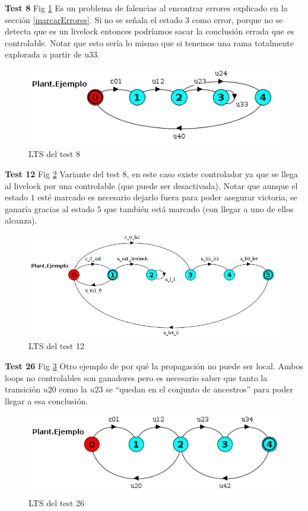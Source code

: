 \smallskip
\textbf{Test 8} Fig \ref{fig:test8} 
Es un problema de falencias al encontrar errores explicado en la sección \ref{marcarErrores}. Si no se señala el estado 3 como error, porque no se detecta que es un livelock entonces podríamos sacar la conclusión errada que es controlable. Notar que esto sería lo mismo que si tenemos una rama totalmente explorada a partir de u33.
\begin{figure}[h]
 \centering
 \includegraphics[scale=0.7]{figures/tests/test8.png}
 \caption{LTS del test 8}
 \label{fig:test8}
\end{figure}

\smallskip
\textbf{Test 12} Fig \ref{fig:test12}
Variante del test 8, en este caso existe controlador ya que se llega al livelock por una controlable (que puede ser desactivada). Notar que aunque el estado $1$ esté marcado es necesario dejarlo fuera para poder asegurar victoria, se ganaría gracias al estado $5$ que también está marcado (con llegar a uno de ellos alcanza). 
\begin{figure}[h]
 \centering
 \includegraphics[scale=0.6]{figures/tests/test12.png}
 \caption{LTS del test 12}
 \label{fig:test12}
\end{figure}

\smallskip
\textbf{Test 26} Fig \ref{fig:test26} 
Otro ejemplo de por qué la propagación no puede ser local. Ambos loops no controlables son ganadores pero es necesario saber que tanto la transición $u20$ como la $u23$ se ``quedan en el conjunto de ancestros'' para poder llegar a esa conclusión.
\begin{figure}[h]
 \centering
 \includegraphics[scale=0.7]{figures/tests/test26.png}
 \caption{LTS del test 26}
 \label{fig:test26}
\end{figure}

